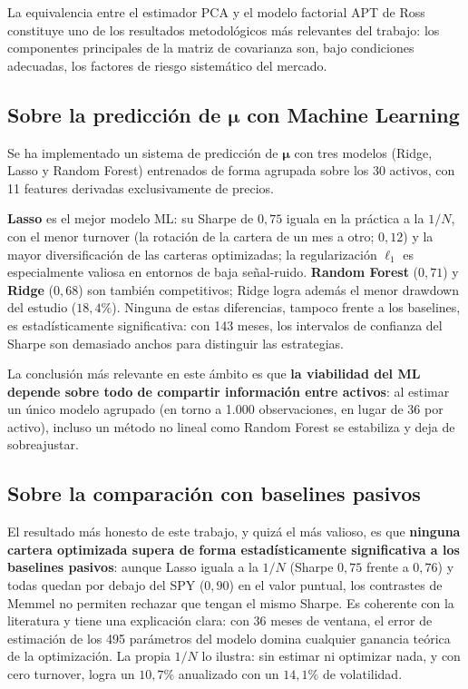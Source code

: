 La equivalencia entre el estimador PCA y el modelo factorial APT de Ross
\cite{Ross1976} constituye uno de los resultados metodológicos más
relevantes del trabajo: los componentes principales de la matriz de
covarianza son, bajo condiciones adecuadas, los factores de riesgo
sistemático del mercado.

\subsection{Sobre la predicción de \texorpdfstring{$\boldsymbol{\mu}$}{μ} con Machine Learning}

Se ha implementado un sistema de predicción de $\boldsymbol{\mu}$ con tres
modelos (Ridge, Lasso y Random Forest) entrenados de forma agrupada sobre los
30 activos, con 11 features derivadas exclusivamente de precios.

\textbf{Lasso} es el mejor modelo ML: su Sharpe de $0{,}75$ iguala en la
práctica a la $1/N$, con el menor turnover (la rotación de la cartera de un mes
a otro; $0{,}12$) y la mayor diversificación de las carteras optimizadas; la
regularización $\ell_1$ es especialmente valiosa en entornos de
baja señal-ruido. \textbf{Random Forest} ($0{,}71$) y \textbf{Ridge} ($0{,}68$)
son también competitivos; Ridge logra además el menor drawdown del estudio
($18{,}4\%$). Ninguna de estas
diferencias, tampoco frente a los baselines, es estadísticamente significativa:
con 143 meses, los intervalos de confianza del Sharpe son demasiado anchos para
distinguir las estrategias.

La conclusión más relevante en este ámbito es que \textbf{la viabilidad del ML
depende sobre todo de compartir información entre activos}: al estimar un
único modelo agrupado (en torno a 1.000 observaciones, en lugar de 36 por
activo), incluso un método no lineal como Random Forest se estabiliza y deja
de sobreajustar.

\subsection{Sobre la comparación con baselines pasivos}

El resultado más honesto de este trabajo, y quizá el más valioso, es que
\textbf{ninguna cartera optimizada supera de forma estadísticamente
significativa a los baselines pasivos}: aunque Lasso iguala a la $1/N$ (Sharpe
$0{,}75$ frente a $0{,}76$) y todas quedan por debajo del SPY ($0{,}90$) en el
valor puntual, los contrastes de Memmel no permiten rechazar que tengan el mismo
Sharpe. Es coherente con la literatura \cite{DeMiguel2009} y tiene una
explicación clara: con 36 meses de ventana, el error de estimación de los 495
parámetros del modelo domina cualquier ganancia teórica de la optimización. La
propia $1/N$ lo ilustra: sin estimar ni optimizar nada, y con cero turnover,
logra un $10{,}7\%$ anualizado con un $14{,}1\%$ de volatilidad.

